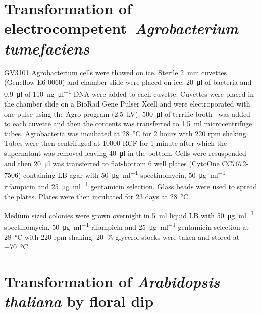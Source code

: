 \documentclass[../main.tex]{subfiles}
\begin{document}
\section{Transformation of electrocompetent~\textit{Agrobacterium tumefaciens}}

GV3101 Agrobacterium cells were thawed on ice.
Sterile \SI{2}{\mm} cuvettes (Geneflow E6\hyp{}0060) and chamber slide were placed on ice.
\SI{20}{\micro\litre} of bacteria and \SI{0.9}{\micro\litre} of \SI{110}{\nano\gram\per\micro\litre} DNA were added to each cuvette.
Cuvettes were placed in the chamber slide on a BioRad Gene Pulser Xcell and were electroporated with one pulse using the Agro program (\SI{2.5}{\kilo\volt}).
\SI{500}{\micro\litre} of terrific broth~\autocite{tartoffImprovedMediaGrowing} was added to each cuvette and then the contents was transferred to \SI{1.5}{\ml} microcentrifuge tubes.
Agrobacteria was incubated at \SI{28}{\celsius} for 2 hours with 220 rpm shaking.
Tubes were then centrifuged at 10000 RCF for 1 minute after which the supernatant was removed leaving \SI{40}{\micro\litre} in the bottom.
Cells were resuspended and then \SI{20}{\micro\litre} was transferred to flat-bottom 6 well plates (CytoOne CC7672\hyp{}7506) containing LB agar with \SI{50}{\micro\gram\per\ml} spectinomycin, \SI{50}{\micro\gram\per\ml} rifampicin and \SI{25}{\micro\gram\per\ml} gentamicin selection.
Glass beads were used to spread the plates.
Plates were then incubated for 2\textendash{}3 days at \SI{28}{\celsius}.

Medium sized colonies were grown overnight in \SI{5}{\ml} liquid LB with \SI{50}{\micro\gram\per\ml} spectinomycin, \SI{50}{\micro\gram\per\ml} rifampicin and \SI{25}{\micro\gram\per\ml} gentamicin selection at \SI{28}{\celsius} with 220 rpm shaking.
\SI{20}{\percent} glycerol stocks were taken and stored at \SI{-70}{\celsius}.

\section{Transformation of \textit{Arabidopsis thaliana} by floral dip}\label{chapter2:methods:floral-dip}
\end{document}
